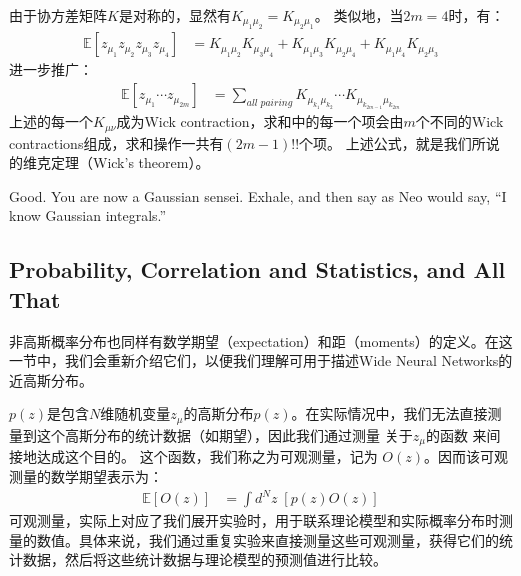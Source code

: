 由于协方差矩阵$K$是对称的，显然有$K_{\mu_1\mu_2}=K_{\mu_2\mu_1}$。
类似地，当$2m=4$时，有：
\begin{equation}
    \begin{split}
        \mathbb{E}[z_{\mu_1}z_{\mu_2}z_{\mu_3}z_{\mu_4}] 
        &= K_{\mu_1\mu_2}K_{\mu_3\mu_4} + 
        K_{\mu_1\mu_3}K_{\mu_2\mu_4} + 
        K_{\mu_1\mu_4}K_{\mu_2\mu_3}
    \end{split}
\end{equation}
进一步推广：
\begin{equation}
    \begin{split}
        \mathbb{E}[z_{\mu_1}\cdots z_{\mu_{2m}}] 
        &= \sum_{all\;pairing} {
            K_{\mu_{k_1}\mu_{k_2}}
            \cdots
            K_{\mu_{k_{2m-1}}\mu_{k_{2m}}}
        }
    \end{split}
\end{equation}
上述的每一个$K_{\mu\nu}$成为Wick contraction，求和中的每一个项会由$m$个不同的Wick contractions组成，求和操作一共有$(2m-1)!!$个项。
上述公式，就是我们所说的维克定理（Wick's theorem）。

Good. You are now a Gaussian sensei. Exhale, and then say as Neo would say, “I know Gaussian integrals.”



\subsection{Probability, Correlation and Statistics, and All That}
\label{sec:prob-corr-stat}

非高斯概率分布也同样有数学期望（expectation）和距（moments）的定义。在这一节中，我们会重新介绍它们，以便我们理解可用于描述Wide Neural Networks的近高斯分布。

$p(z)$是包含$N$维随机变量$z_\mu$的高斯分布$p(z)$。在实际情况中，我们无法直接测量到这个高斯分布的统计数据（如期望），因此我们通过测量 关于$z_\mu$的函数 来间接地达成这个目的。 这个函数，我们称之为可观测量，记为 $O(z)$。因而该可观测量的数学期望表示为：
\begin{equation}
    \begin{split}
        \label{eq:1.46}
        \mathbb{E}[O(z)] 
        &= \int d^N\!z\;[p(z)O(z)]
    \end{split}
\end{equation}
可观测量，实际上对应了我们展开实验时，用于联系理论模型和实际概率分布时测量的数值。具体来说，我们通过重复实验来直接测量这些可观测量，获得它们的统计数据，然后将这些统计数据与理论模型的预测值进行比较。

